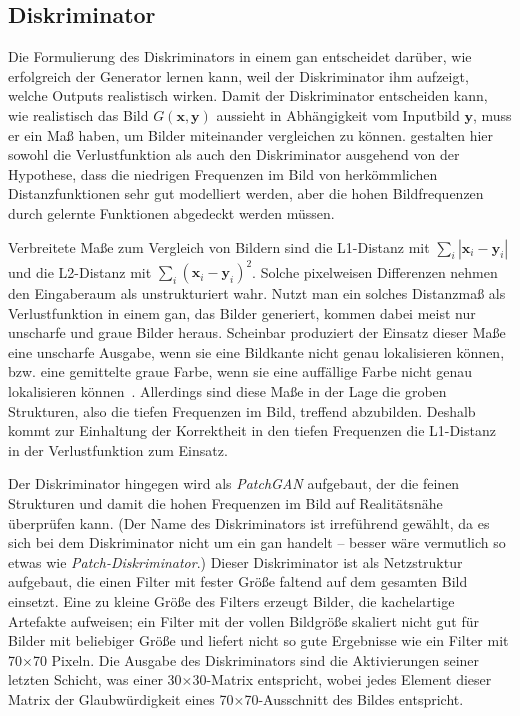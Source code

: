 \subsection{Diskriminator}

Die Formulierung des Diskriminators in einem \gls{gan} entscheidet darüber, wie erfolgreich der Generator lernen kann, weil der Diskriminator ihm aufzeigt, welche Outputs realistisch wirken.
Damit der Diskriminator entscheiden kann, wie realistisch das Bild $ G(\mathbf{x}, \mathbf{y}) $ aussieht in Abhängigkeit vom Inputbild $ \mathbf{y} $, muss er ein Maß haben, um Bilder miteinander vergleichen zu können.
\citeauthor{Isola.2017} gestalten hier sowohl die Verlustfunktion als auch den Diskriminator ausgehend von der Hypothese, dass die niedrigen Frequenzen im Bild von herkömmlichen Distanzfunktionen sehr gut modelliert werden, aber die hohen Bildfrequenzen durch gelernte Funktionen abgedeckt werden müssen.

Verbreitete Maße zum Vergleich von Bildern sind die L1-Distanz mit $ \sum_i | \mathbf{x}_i - \mathbf{y}_i | $ und die L2-Distanz mit $ \sum_i (\mathbf{x}_i - \mathbf{y}_i)^2 $.
Solche pixelweisen Differenzen nehmen den Eingaberaum als unstrukturiert wahr.
Nutzt man ein solches Distanzmaß als Verlustfunktion in einem \gls{gan}, das Bilder generiert, kommen dabei meist nur unscharfe und graue Bilder heraus.
Scheinbar produziert der Einsatz dieser Maße eine unscharfe Ausgabe, wenn sie eine Bildkante nicht genau lokalisieren können, bzw. eine gemittelte graue Farbe, wenn sie eine auffällige Farbe nicht genau lokalisieren können~\cite{Isola.2017}.
Allerdings sind diese Maße in der Lage die groben Strukturen, also die tiefen Frequenzen im Bild, treffend abzubilden.
Deshalb kommt zur Einhaltung der Korrektheit in den tiefen Frequenzen die L1-Distanz in der Verlustfunktion zum Einsatz.

Der Diskriminator hingegen wird als \emph{PatchGAN} aufgebaut, der die feinen Strukturen und damit die hohen Frequenzen im Bild auf Realitätsnähe überprüfen kann.
(Der Name des Diskriminators ist irreführend gewählt, da es sich bei dem Diskriminator nicht um ein \gls{gan} handelt -- besser wäre vermutlich so etwas wie \emph{Patch-Diskriminator}.)
Dieser Diskriminator ist als Netzstruktur aufgebaut, die einen Filter mit fester Größe faltend auf dem gesamten Bild einsetzt.
Eine zu kleine Größe des Filters erzeugt Bilder, die kachelartige Artefakte aufweisen; ein Filter mit der vollen Bildgröße skaliert nicht gut für Bilder mit beliebiger Größe und liefert nicht so gute Ergebnisse wie ein Filter mit 70$\times$70 Pixeln.
Die Ausgabe des Diskriminators sind die Aktivierungen seiner letzten Schicht, was einer 30$\times$30-Matrix entspricht, wobei jedes Element dieser Matrix der Glaubwürdigkeit eines 70$\times$70-Ausschnitt des Bildes entspricht.

